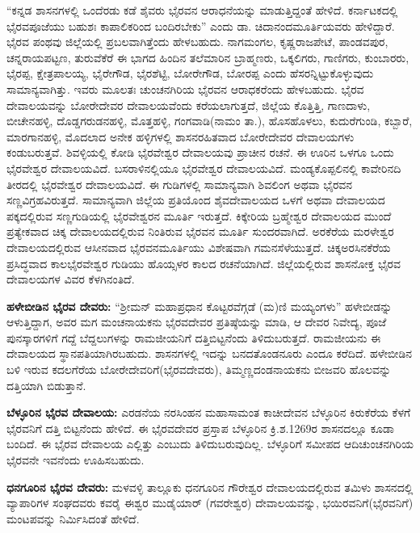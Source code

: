 “ಕನ್ನಡ ಶಾಸನಗಳಲ್ಲಿ ಒಂದೆರಡು ಕಡೆ ಶೈವರು ಭೈರವನ ಆರಾಧನೆಯನ್ನು ಮಾಡುತ್ತಿದ್ದಂತೆ ಹೇಳಿದೆ. ಕರ್ನಾಟಕದಲ್ಲಿ ಭೈರವಪೂಜೆಯು ಬಹುಶಃ ಕಾಪಾಲಿಕರಿಂದ ಬಂದಿರಬೇಕು” ಎಂದು ಡಾ. ಚಿದಾನಂದಮೂರ್ತಿಯವರು ಹೇಳಿದ್ದಾರೆ. ಭೈರವ ಪಂಥವು ಜಿಲ್ಲೆಯಲ್ಲಿ ಪ್ರಬಲವಾಗಿತ್ತೆಂದು ಹೇಳಬಹುದು. ನಾಗಮಂಗಲ, ಕೃಷ್ಣರಾಜಪೇಟೆ, ಪಾಂಡವಪುರ, ಚನ್ನರಾಯಪಟ್ಟಣ, ತುರುವೆಕೆರೆ ಈ ಭಾಗದ ಹಿಂದಿನ ತಲೆಮಾರಿನ ಬ್ರಾಹ್ಮಣರು, ಒಕ್ಕಲಿಗರು, ಗಾಣಿಗರು, ಕುಂಬಾರರು, ಭೈರಪ್ಪ, ಕ್ಷೇತ್ರಪಾಲಯ್ಯ, ಭೈರೇಗೌಡ, ಭೈರಶೆಟ್ಟಿ, ಬೋರೇಗೌಡ, ಬೋರಪ್ಪ ಎಂದು ಹೆಸರನ್ನಿಟ್ಟುಕೊಳ್ಳುವುದು ಸಾಮಾನ್ಯವಾಗಿತ್ತು. ಇವರು ಮೂಲತಃ ಚುಂಚನಗಿರಿಯ ಭೈರವನ ಆರಾಧಕರೆಂದು ಹೇಳಬಹುದು. ಭೈರವ ದೇವಾಲಯವನ್ನು ಬೋರೇದೇವರ ದೇವಾಲಯವೆಂದು ಕರೆಯಲಾಗುತ್ತದೆ, ಜಿಲ್ಲೆಯ ಕೊತ್ತಿತ್ತಿ, ಗಾಣದಾಳು, ಬೀಚೇನಹಳ್ಳಿ, ದೊಡ್ಡಗರುಡನಹಳ್ಳಿ, ಮೊತ್ತಹಳ್ಳಿ, ಗಂಗವಾಡಿ(ನಾಮಂ ತಾ.), ಹೊಸಹೊಳಲು, ಕುದುರೆಗುಂಡಿ, ಕಬ್ಬಾರೆ, ಮಾರಗಾನಹಳ್ಳಿ, ಮೊದಲಾದ ಅನೇಕ ಹಳ್ಳಿಗಳಲ್ಲಿ ಶಾಸನರಹಿತವಾದ ಬೋರೇದೇವರ ದೇವಾಲಯಗಳು ಕಂಡುಬರುತ್ತವೆ. ಶಿವಳ್ಳಿಯಲ್ಲಿ ಕೋಡಿ ಭೈರವೇಶ್ವರ ದೇವಾಲಯವು ಪ್ರಾಚೀನ ರಚನೆ. ಈ ಊರಿನ ಒಳಗೂ ಒಂದು ಭೈರವೇಶ್ವರ ದೇವಾಲಯವಿದೆ. ಬಸರಾಳಿನಲ್ಲಿಯೂ ಭೈರವೇಶ್ವರ ದೇವಾಲಯವಿದೆ. ಮಂಡ್ಯಕೊಪ್ಪಲಿನಲ್ಲಿ ಕಾವೇರಿನದಿ ತೀರದಲ್ಲಿ ಭೈರವೇಶ್ವರ ದೇವಾಲಯವಿದೆ. ಈ ಗುಡಿಗಳಲ್ಲಿ ಸಾಮಾನ್ಯವಾಗಿ ಶಿವಲಿಂಗ ಅಥವಾ ಭೈರವನ ಸಣ್ಣವಿಗ್ರಹವಿರುತ್ತದೆ. ಸಾಮಾನ್ಯವಾಗಿ ಜಿಲ್ಲೆಯ ಪ್ರತಿಯೊಂದ ಶೈವದೇವಾಲಯದ ಒಳಗೆ ಅಥವಾ ದೇವಾಲಯದ ಪಕ್ಕದಲ್ಲಿರುವ ಸಣ್ಣಗುಡಿಯಲ್ಲಿ ಭೈರವೇಶ್ವರನ ಮೂರ್ತಿ ಇರುತ್ತದೆ. ಕಿಕ್ಕೇರಿಯ ಬ್ರಹ್ಮೇಶ್ವರ ದೇವಾಲಯದ ಮುಂದೆ ಪ್ರತ್ಯೇಕವಾದ ಚಿಕ್ಕ ದೇವಾಲಯದಲ್ಲಿರುವ ನಿಂತಿರುವ ಭೈರವನ ಮೂರ್ತಿ ಸುಂದರವಾಗಿದೆ. ಅರಕೆರೆಯ ಮರಳೇಶ್ವರ ದೇವಾಲಯದಲ್ಲಿರುವ ಆಸೀನವಾದ ಭೈರವನಮೂರ್ತಿಯು ವಿಶೇಷವಾಗಿ ಗಮನಸೆಳೆಯುತ್ತದೆ. ಚಿಕ್ಕಅರಸಿನಕೆರೆಯ ಪ್ರಸಿದ್ಧವಾದ ಕಾಲಭೈರವೇಶ್ವರ ಗುಡಿಯು ಹೊಯ್ಸಳರ ಕಾಲದ ರಚನೆಯಾಗಿದೆ. ಜಿಲ್ಲೆಯಲ್ಲಿರುವ ಶಾಸನೋಕ್ತ ಭೈರವ ದೇವಾಲಯಗಳ ವಿವರ ಕೆಳಗಿನಂತಿದೆ.

\textbf{ಹಳೇಬೀಡಿನ ಭೈರವ ದೇವರು:} “ಶ‍್ರೀಮನ್​ ಮಹಾಪ್ರಧಾನ ಕೊಟ್ಟರವೆಗ್ಗಡೆ (ಮ)ಣಿ ಮಯ್ಯಂಗಳು” ಹಳೇಬೀಡನ್ನು ಆಳುತ್ತಿದ್ದಾಗ, ಅವರ ಮಗ ಮಂಚನಾಯಕನು ಭೈರವದೇವರ ಪ್ರತಿಷ್ಠೆಯನ್ನು ಮಾಡಿ, ಆ ದೇವರ ನಿವೇದ್ಯ, ಪೂಜೆ ಪುನಸ್ಕಾರಗಳಿಗೆ ಗದ್ದೆ ಬೆದ್ದಲುಗಳನ್ನು ರಾಮಜೀಯನಿಗೆ ದತ್ತಿಬಿಟ್ಟನೆಂದು ತಿಳಿದುಬರುತ್ತದೆ. ರಾಮಜೀಯನು ಈ ದೇವಾಲಯದ ಸ್ಥಾನಪತಿಯಾಗಿರಬಹುದು. ಶಾಸನಗಳಲ್ಲಿ ಇದನ್ನು ಬನದತೊಂಡನೂರು ಎಂದೂ ಕರೆದಿದೆ. ಹಳೇಬೀಡಿನ ಬಳಿ ಇರುವ ಕದಲಗೆರೆಯ ಬೋರೇದೇವರಿಗೆ(ಭೈರವದೇವರು), ತಿಮ್ಮಣ್ಣದಂಡನಾಯಕನು ಬೀಜವರಿ ಹೊಲವನ್ನು ದತ್ತಿಯಾಗಿ ಬಿಡುತ್ತಾನೆ.

\textbf{ಬೆಳ್ಳೂರಿನ ಭೈರವ ದೇವಾಲಯ:} ಎರಡನೆಯ ನರಸಿಂಹನ ಮಹಾಸಾಮಂತ ಕಾಚೀದೇವನ ಬೆಳ್ಳೂರಿನ ಕಿರುಕೆರೆಯ ಕೆಳಗೆ ಭೈರವನಿಗೆ ದತ್ತಿ ಬಿಟ್ಟನೆಂದು ಹೇಳಿದೆ. ಈ ಭೈರವದೇವರ ಪ್ರಸ್ತಾಪ ಬೆಳ್ಳೂರಿನ ಕ್ರಿ.ಶ.1269ರ ಶಾಸನದಲ್ಲೂ ಕೂಡಾ ಬಂದಿದೆ. ಈ ಭೈರವ ದೇವಾಲಯ ಎಲ್ಲಿತ್ತು ಎಂಬುದು ತಿಳಿದುಬರುವುದಿಲ್ಲ. ಬೆಳ್ಳೂರಿಗೆ ಸಮೀಪದ ಆದಿಚುಂಚನಗಿರಿಯ ಭೈರವನೇ ಇವನೆಂದು ಊಹಿಸಬಹುದು. 

\textbf{ಧನಗೂರಿನ ಭೈರವ ದೇವರು: } ಮಳವಳ್ಳಿ ತಾಲ್ಲೂಕು ಧನಗೂರಿನ ಗೌರೇಶ್ವರ ದೇವಾಲಯದಲ್ಲಿರುವ ತಮಿಳು ಶಾಸನದಲ್ಲಿ ವ್ಯಾಪಾರಿಗಳ ಸಂಘದವರು ಕವರೈ ಈಶ್ವರ ಮುಡೈಯಾರ್​ (ಗವರೇಶ್ವರ) ದೇವಾಲಯವನ್ನು, ಭಯಿರವನಿಗೆ(ಭೈರವನಿಗೆ) ಮಂಟಪವನ್ನು ನಿರ್ಮಿಸಿದಂತೆ ಹೇಳಿದೆ.

